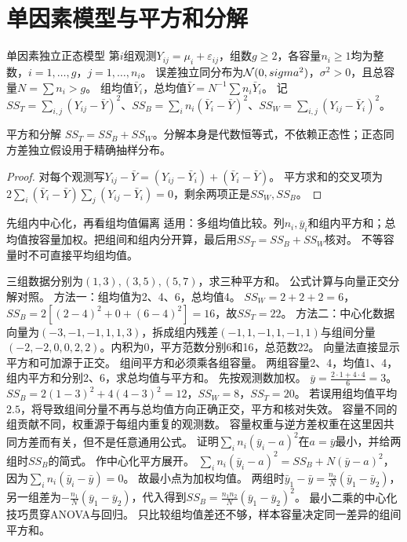 \section{单因素模型与平方和分解}\label{sec:91}
\begin{definition}{单因素独立正态模型}
第$i$组观测$Y_{ij}=\mu_i+\varepsilon_{ij}$，组数$g\ge2$，各容量$n_i\ge1$均为整数，$i=1,\ldots,g$，$j=1,\ldots,n_i$。
误差独立同分布为$\mathcal N(0,sigma^2)$，$\sigma^2>0$，且总容量$N=\sum n_i>g$。
组均值$\bar Y_i$，总均值$\bar Y=N^{-1}\sum n_i\bar Y_i$。
记$SS_T=\sum_{i,j}(Y_{ij}-\bar Y)^2$、$SS_B=\sum_i n_i(\bar Y_i-\bar Y)^2$、$SS_W=\sum_{i,j}(Y_{ij}-\bar Y_i)^2$。
\end{definition}
\begin{theorem}{平方和分解}
$SS_T=SS_B+SS_W$。分解本身是代数恒等式，不依赖正态性；正态同方差独立假设用于精确抽样分布。
\end{theorem}
\begin{proof}
对每个观测写$Y_{ij}-\bar Y=(Y_{ij}-\bar Y_i)+(\bar Y_i-\bar Y)$。
平方求和的交叉项为$2\sum_i(\bar Y_i-\bar Y)\sum_j(Y_{ij}-\bar Y_i)=0$，剩余两项正是$SS_W,SS_B$。
\end{proof}
\begin{method}{先组内中心化，再看组均值偏离}
适用：多组均值比较。列$n_i,\bar y_i$和组内平方和；总均值按容量加权。把组间和组内分开算，最后用$SS_T=SS_B+SS_W$核对。
不等容量时不可直接平均组均值。
\end{method}
{三组数据分别为$(1,3),(3,5),(5,7)$，求三种平方和。}
{公式计算与向量正交分解对照。}
{方法一：组均值为2、4、6，总均值4。
$SS_W=2+2+2=6$，$SS_B=2[(2-4)^2+0+(6-4)^2]=16$，故$SS_T=22$。
方法二：中心化数据向量为$(-3,-1,-1,1,1,3)$，拆成组内残差$(-1,1,-1,1,-1,1)$与组间分量$(-2,-2,0,0,2,2)$。内积为0，平方范数分别6和16，总范数22。}
{向量法直接显示平方和可加源于正交。}
{组间平方和必须乘各组容量。}
{两组容量2、4，均值1、4，组内平方和分别2、6，求总均值与平方和。}
{先按观测数加权。}
{$\bar y=\frac{2\cdot1+4\cdot4}{6}=3$。
$SS_B=2(1-3)^2+4(4-3)^2=12$，$SS_W=8$，$SS_T=20$。
若误用组均值平均$2.5$，将导致组间分量不再与总均值方向正确正交，平方和核对失效。}
{容量不同的组贡献不同，权重源于每组内重复的观测数。}
{容量权重与逆方差权重在这里因共同方差而有关，但不是任意通用公式。}
{证明$\sum_i n_i(\bar y_i-a)^2$在$a=\bar y$最小，并给两组时$SS_B$的简式。}
{作中心化平方展开。}
{$\sum_i n_i(\bar y_i-a)^2=SS_B+N(\bar y-a)^2$，因为$\sum_i n_i(\bar y_i-\bar y)=0$。
故最小点为加权均值。
两组时$\bar y_1-\bar y=\frac{n_2}{N}(\bar y_1-\bar y_2)$，另一组差为$-\frac{n_1}{N}(\bar y_1-\bar y_2)$，代入得到$SS_B=\frac{n_1n_2}{N}(\bar y_1-\bar y_2)^2$。}
{最小二乘的中心化技巧贯穿ANOVA与回归。}
{只比较组均值差还不够，样本容量决定同一差异的组间平方和。}

